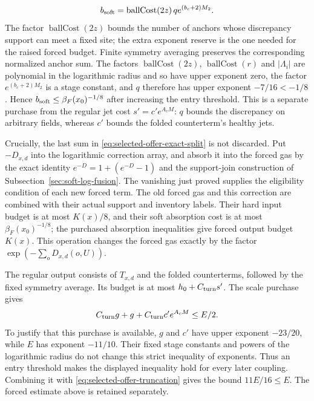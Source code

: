 \[
 b_{\rm soft}=\operatorname{ballCost}(2z)\,q
                             e^{(b_c+2)M_2}.
\]
The factor $\operatorname{ballCost}(2z)$ bounds the number of anchors
whose discrepancy support can meet a fixed site; the extra exponent
reserve is the one needed for the raised forced budget. Finite
symmetry averaging preserves the corresponding normalized anchor
sum. The factors $\operatorname{ballCost}(2z)$,
$\operatorname{ballCost}(r)$ and $|\Lambda_i|$ are polynomial in the
logarithmic radius and so have upper exponent zero, the factor
$e^{(b_c+2)M_2}$ is a stage constant, and $q$ therefore has upper
exponent $-7/16<-1/8$. Hence
$b_{\rm soft}\le\beta_F(x_0)^{-1/8}$ after increasing the entry
threshold. This is a separate purchase from the regular jet cost
$s'=c'e^{A_cM}$: $q$ bounds the discrepancy on arbitrary fields,
whereas $c'$ bounds the folded counterterm's healthy jets.

Crucially, the last sum in \eqref{eq:selected-offer-exact-split} is
not discarded. Put $-D_{x,d}$ into the logarithmic correction array,
and absorb it into the forced gas by the exact identity
$e^{-D}=1+(e^{-D}-1)$ and the support-join construction of
Subsection~\ref{sec:soft-log-fusion}. The vanishing just proved supplies
the eligibility condition of each new forced term. The old forced
gas and this correction are combined with their actual support and
inventory labels. Their hard input budget is at most $K(x)/8$,
and their soft absorption cost is at most $\beta_F(x_0)^{-1/8}$;
the purchased absorption inequalities give forced output budget
$K(x)$. This operation changes the forced gas exactly by the factor
$\exp(-\sum_oD_{x,d}(o,U))$.

The regular output consists of $T_{x,d}$ and the folded counterterms,
followed by the fixed symmetry average. Its budget is at most
$h_0+C_{\rm turn}s'$. The scale purchase gives
\[
 C_{\rm turn}g+g+C_{\rm turn}c'e^{A_cM}\le E/2.
\]
To justify that this purchase is available, $g$ and $c'$ have upper
exponent $-23/20$, while $E$ has exponent $-11/10$. Their fixed
stage constants and powers of the logarithmic radius do not change
this strict inequality of exponents. Thus an entry threshold makes
the displayed inequality hold for every later coupling. Combining
it with \eqref{eq:selected-offer-truncation} gives the bound
$11E/16\le E$. The forced estimate above is retained separately.

